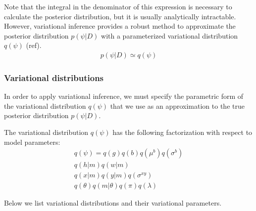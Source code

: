 Note that the integral in the denominator of this expression is necessary to calculate the posterior distribution, but it is usually analytically intractable. However, variational inference provides a robust method to approximate the posterior distribution $p(\psi | D)$ with a parameterized variational distribution $q(\psi)$ (ref).
%
\begin{gather*}
    p(\psi | D) \simeq q(\psi)
\end{gather*}


\subsubsection*{Variational distributions}

In order to apply variational inference, we must specify the parametric form of the variational distribution $q(\psi)$
that we use as an approximation to the true posterior distribution $p(\psi | D)$.

The variational distribution $q(\psi)$ has the following factorization with respect to model parameters:
%
\begin{gather*}
    q(\psi) = q(g) q(b) q(\mu^b) q(\sigma^b) \\
    q(h | m) q(w | m) \\
    q(x | m) q(y | m) q(\sigma^{xy}) \\
    q(\theta) q(m | \theta) q(\pi) q(\lambda)
\end{gather*}

Below we list variational distributions and their variational parameters.

